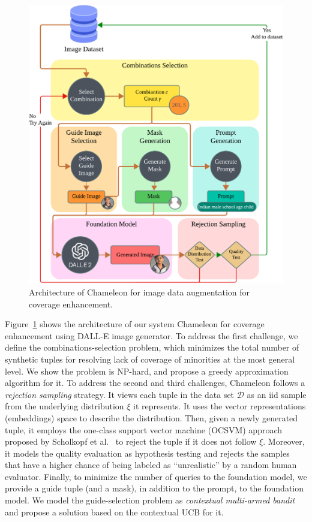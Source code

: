 \documentclass[11pt]{article}
\newcommand{\dee}{\mathcal{D}}
\newcommand{\fmsystem}{{\sc Chameleon}\xspace}
\begin{document}
\begin{figure}
\centering
\vspace{-3mm}
\scriptsize
    \includegraphics[width=.45\textwidth]{submissions/submission1/shahbazi/enhanced_pipeline.png}
\vspace{-3mm}
\caption{\small Architecture of \fmsystem for image data augmentation for coverage enhancement.}\label{fig:chameleon}
\end{figure}

\noindent Figure~\ref{fig:chameleon} shows the architecture of our system \fmsystem \cite{chameleon} for coverage enhancement using DALL-E image generator.
To address the first challenge, we define the combinations-selection problem, which minimizes the total number of synthetic tuples for resolving lack of coverage of minorities at the most general level. We show the problem is {\sc NP}-hard, and propose a greedy approximation algorithm for it.
To address the second and third challenges, \fmsystem follows a {\it rejection sampling} strategy.
It views each tuple in the data set $\dee$ as an iid sample from the underlying distribution $\xi$ it represents. It uses the vector representations (embeddings) space to describe the distribution. Then, given a newly generated tuple, it employs the one-class support vector machine (OCSVM) approach proposed by Scholkopf et al.~\cite{scholkopf1999support} to reject the tuple if it does not follow $\xi$.
Moreover, it models the quality evaluation as hypothesis testing and rejects the samples that have a higher chance of being labeled as ``unrealistic'' by a random human evaluator.
Finally, to minimize the number of queries to the foundation model, we provide a guide tuple (and a mask), in addition to the prompt, to the foundation model. We model the guide-selection problem as {\it contextual multi-armed bandit} and propose a solution based on the contextual UCB for it.
\end{document}
